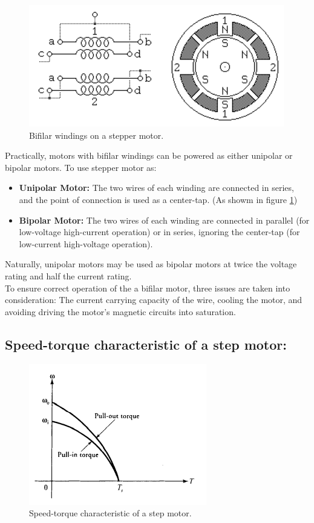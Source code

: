 \documentclass[journal]{IEEEtran}
\begin{document}
\begin{figure}[h]
    \centering
    \includegraphics[scale=0.75]{Stepper/bifiliarStep.png}
    \caption{Bifilar windings on a stepper motor.}
    \label{bifilar}
\end{figure}
Practically, motors with bifilar windings can be powered as either unipolar or bipolar motors. To use stepper motor as:
\begin{itemize}
    \item \textbf{Unipolar Motor:} The two wires of each winding are connected in  series, and the point of connection is used as a center-tap. (As showm in figure \ref{bifilar})
    \item \textbf{Bipolar Motor:} The two wires of each winding are connected in parallel (for low-voltage high-current operation) or in series, ignoring the center-tap (for low-current high-voltage operation).
\end{itemize}
Naturally, unipolar motors may be used as bipolar motors at twice the voltage rating and half the current rating.\\
To ensure correct operation of the a bifilar motor, three issues are taken into consideration: The current carrying capacity of the wire, cooling the motor, and avoiding driving the motor's magnetic circuits into saturation.\\


\subsection{Speed-torque characteristic of a step motor:}
\begin{figure}[h]
    \centering
    \includegraphics[scale=0.7]{Stepper/speed-torque characteristic for step motor.PNG}
    \caption{Speed-torque characteristic of a step motor.}
    \label{speed torque graph}
\end{figure}
\end{document}
